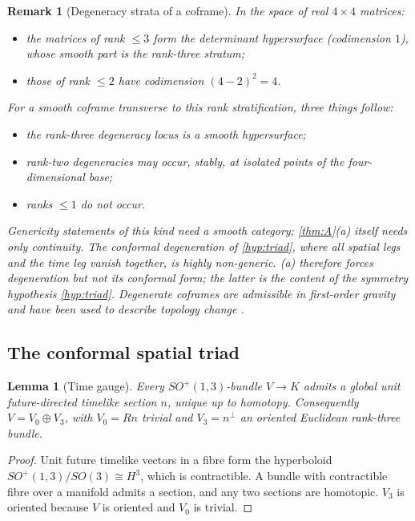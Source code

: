 \documentclass[11pt]{article}
\theoremstyle{canonmath}
\newtheorem{lemma}[theorem]{Lemma}
\newtheorem{remark}[theorem]{Remark}
\theoremstyle{canonpostulate}
\theoremstyle{canonproposition}
\theoremstyle{canonmath}
\theoremstyle{canonproposition}
\providecommand{\Vb}{\mathcal{V}}
\providecommand{\Klein}{\mathcal{K}}
\providecommand{\R}{\mathbb{R}}
\def\mathbb#1{#1}%
\def\mathcal#1{#1}%
\begin{document}
\begin{remark}[Degeneracy strata of a coframe]\label{rem:generic}
In the space of real $4\times4$ matrices:
\begin{itemize}
\item the matrices of rank $\le 3$ form the determinant hypersurface (codimension $1$), whose smooth part is the rank-three stratum;
\item those of rank $\le 2$ have codimension $(4-2)^2 = 4$.
\end{itemize}
For a \emph{smooth} coframe transverse to this rank stratification, three things follow:
\begin{itemize}
\item the rank-three degeneracy locus is a smooth hypersurface;
\item rank-two degeneracies may occur, stably, at isolated points of the four-dimensional base;
\item ranks $\le1$ do not occur.
\end{itemize}
Genericity statements of this kind need a smooth category; \cref{thm:A}(a) itself needs only continuity. The conformal degeneration of \ref{hyp:triad}, where all spatial legs and the time leg vanish together, is highly non-generic. (a) therefore forces degeneration but not its conformal form; the latter is the content of the symmetry hypothesis \ref{hyp:triad}. Degenerate coframes are admissible in first-order gravity and have been used to describe topology change \cite{Horowitz1991}.
\end{remark}

\subsection{The conformal spatial triad}

\begin{lemma}[Time gauge]\label{lem:timegauge}
Every $SO^+(1,3)$-bundle $\Vb\to\Klein$ admits a global unit future-directed timelike section $n$, unique up to homotopy. Consequently $\Vb = \Vb_0 \oplus \Vb_3$, with $\Vb_0 = \R n$ trivial and $\Vb_3 = n^\perp$ an oriented Euclidean rank-three bundle.
\end{lemma}

\begin{proof}
Unit future timelike vectors in a fibre form the hyperboloid $SO^+(1,3)/SO(3) \cong \mathbb{H}^3$, which is contractible. A bundle with contractible fibre over a manifold admits a section, and any two sections are homotopic. $\Vb_3$ is oriented because $\Vb$ is oriented and $\Vb_0$ is trivial.
\end{proof}
\end{document}
